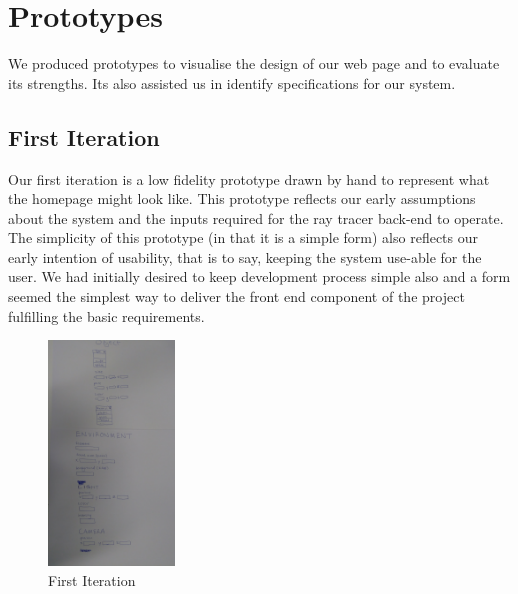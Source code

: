\documentclass[a4paper]{report}
\begin{document}
	
	\section{Prototypes} \label{sec:prototypes}
	We produced prototypes to visualise the design of our web page and to evaluate its strengths. Its also assisted us in identify specifications for our system. 
	
	\subsection{First Iteration}
	
	Our first iteration is a low fidelity prototype drawn by hand to represent what the homepage might look like. This prototype reflects our early assumptions about the system and the inputs required for the ray tracer back-end to operate. The simplicity of this prototype (in that it is a simple form) also reflects our early intention of usability, that is to say, keeping the system use-able for the user. We had initially desired to keep development process simple also and a form seemed the simplest way to deliver the front end component of the project fulfilling the basic requirements.
	
	
	\begin{figure}[ht!]
		\centering
		\includegraphics[angle=90, width=0.3\textwidth]{First_Iteration_Prototype.jpg}
		\caption{First Iteration}
		\label{fig:firstIt}
	\end{figure}
	
\end{document}
